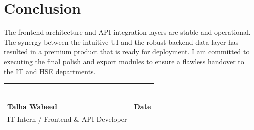 \documentclass[12pt, a4paper]{article}
\begin{document}
\section{Conclusion}
The frontend architecture and API integration layers are stable and operational. The synergy between the intuitive UI and the robust backend data layer has resulted in a premium product that is ready for deployment. I am committed to executing the final polish and export modules to ensure a flawless handover to the IT and HSE departments.

\vspace{2cm}
\noindent\begin{tabularx}{\textwidth}{@{}X X@{}}
    \rule{6cm}{1pt} & \rule{6cm}{1pt} \\
    \textbf{Talha Waheed} & \textbf{Date} \\
    IT Intern / Frontend \& API Developer & \\
\end{tabularx}
\end{document}
